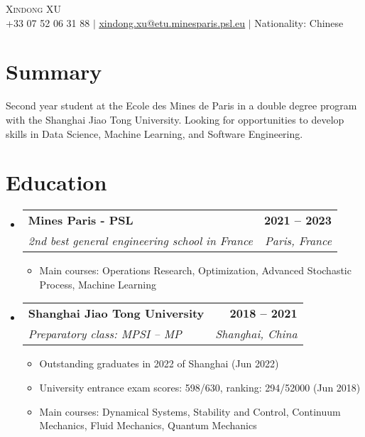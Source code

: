 \documentclass[letterpaper,11pt]{article}
\makeatletter
\newcommand{\resumeItem}[1]{
  \item\small{
    {#1 \vspace{-2pt}}
  }
}
\newcommand{\resumeSubheading}[4]{
  \vspace{-2pt}\item
    \begin{tabular*}{1.0\textwidth}[t]{l@{\extracolsep{\fill}}r}
      \textbf{#1} & \textbf{\small #2} \\
      \textit{\small#3} & \textit{\small #4} \\
    \end{tabular*}\vspace{-7pt}
}
\newcommand{\resumeSubHeadingListStart}{\begin{itemize}[leftmargin=0.0in, label={}]}
\newcommand{\resumeSubHeadingListEnd}{\end{itemize}}
\newcommand{\resumeItemListStart}{\begin{itemize}}
\newcommand{\resumeItemListEnd}{\end{itemize}\vspace{-5pt}}
\makeatother
\begin{document}

\begin{center}
    {\Huge \scshape Xindong XU} \\ \vspace{1pt}
    \small +33 07 52 06 31 88 $|$
    \href{mailto:xindong.xu@etu.minesparis.psl.eu}{\underline{xindong.xu@etu.minesparis.psl.eu}} $|$
    Nationality: Chinese
    \vspace{-8pt}
\end{center}

\section{Summary}
Second year student at the Ecole des Mines de Paris in a double degree program with the Shanghai Jiao Tong University. Looking for opportunities to develop skills in Data Science, Machine Learning, and Software Engineering.

\section{Education}
\resumeSubHeadingListStart
    \resumeSubheading
    {Mines Paris - PSL}{2021 -- 2023}
    {2nd best general engineering school in France}{Paris, France}
        \resumeItemListStart
        \resumeItem{Main courses: Operations Research, Optimization, Advanced Stochastic Process, Machine Learning}
        \resumeItemListEnd
    \resumeSubheading
    {Shanghai Jiao Tong University}{2018 -- 2021}
    {Preparatory class: MPSI -- MP}{Shanghai, China}
        \resumeItemListStart
        \resumeItem{Outstanding graduates in 2022 of Shanghai (Jun 2022)}
        \resumeItem{University entrance exam scores: 598/630, ranking: 294/52000 (Jun 2018)}
        \resumeItem{Main courses: Dynamical Systems, Stability and Control, Continuum Mechanics, Fluid Mechanics, Quantum Mechanics}
        \resumeItemListEnd
\resumeSubHeadingListEnd

\end{document}
